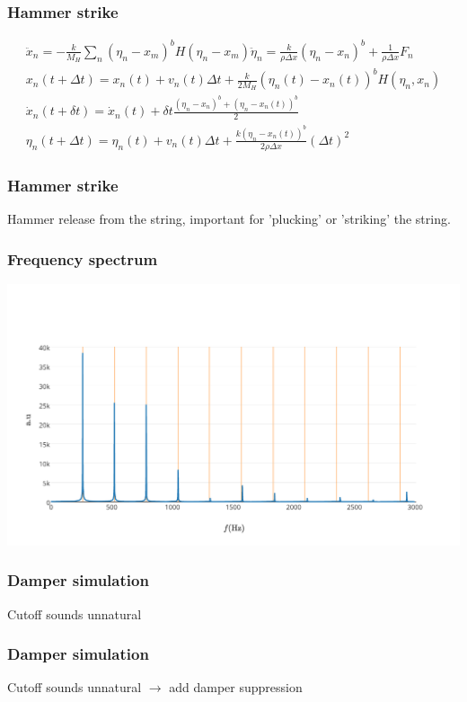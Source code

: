 \documentclass{beamer}
\begin{document}
\begin{frame}\frametitle{Hammer strike}
\begin{gather*}
\ddot{x}_n = -\frac{k}{M_H}\sum_n (\eta_n-x_m)^bH(\eta_n-x_m)\ddot{\eta}_n = \frac{k}{\rho\Delta x}\left(\eta_n-x_n\right)^b+\frac{1}{\rho\Delta x}F_n\\
x_n(t+\Delta t) = x_n(t) + v_n(t)\Delta t + \frac{k}{2M_H}\left(\eta_n(t)-x_n(t)\right)^bH(\eta_n,x_n)\\
\dot{x}_n(t+\delta t) = \dot{x}_n(t) + \delta t \frac{\left(\eta_n-x_n\right)^b+\left(\eta_n-x_n(t)\right)^b}{2}\\
\eta_n(t+\Delta t) = \eta_n(t) + v_n(t)\Delta t + \frac{k\left(\eta_n-x_n(t)\right)^b}{2\rho \Delta x}\left(\Delta t\right)^2
\end{gather*}
\end{frame}


\begin{frame}\frametitle{Hammer strike}
Hammer release from the string, important for 'plucking' or 'striking' the string.
\end{frame}


\begin{frame}\frametitle{Frequency spectrum}
\begin{minipage}{1\textwidth}
		\includegraphics[width=\textwidth]{images/freq.pdf}
	\end{minipage}
\end{frame}

\begin{frame}\frametitle{Damper simulation}
Cutoff sounds unnatural
\end{frame}

\begin{frame}\frametitle{Damper simulation}
Cutoff sounds unnatural $\rightarrow$ add damper suppression
\end{frame}
\end{document}
